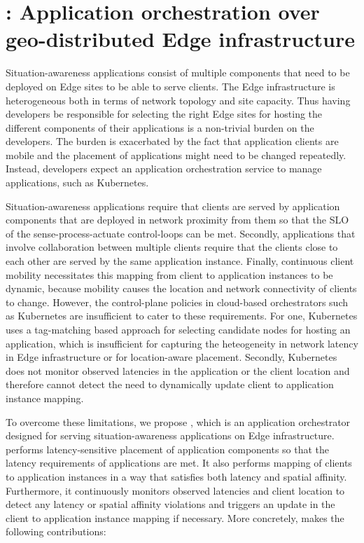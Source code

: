 \chapter{\oneedge{}: Application orchestration over geo-distributed Edge infrastructure}
\label{sec:oneedge}

\par Situation-awareness applications consist of multiple components that need to be deployed on Edge sites to be able to serve clients. The Edge infrastructure is heterogeneous both in terms of network topology and site capacity. Thus having  developers be responsible for selecting the right Edge sites for hosting the different components of their applications is a non-trivial burden on the developers. The burden is exacerbated by the fact that application clients are mobile and the placement of applications might need to be changed repeatedly. Instead, developers expect an application orchestration service to manage applications, such as Kubernetes. 
\par Situation-awareness applications require that clients are served by application components that are deployed in network proximity from them so that the SLO of the sense-process-actuate control-loops can be met. Secondly, applications that involve collaboration between multiple clients require that the clients close to each other are served by the same application instance. Finally, continuous client mobility necessitates this mapping from client to application instances to be dynamic, because mobility causes the location and network connectivity of clients to change. However, the control-plane policies in cloud-based orchestrators such as Kubernetes  are insufficient to cater to these requirements. For one, Kubernetes uses a tag-matching based approach for selecting candidate nodes for hosting an application, which is insufficient for capturing the heteogeneity in network latency in Edge infrastructure or for location-aware placement. Secondly, Kubernetes does not monitor observed latencies in the application or the client location and therefore cannot detect the need to dynamically update client to application instance mapping.
\par To overcome these limitations, we propose \oneedge{}, which is an application orchestrator designed for serving situation-awareness applications on Edge infrastructure. \oneedge{} performs latency-sensitive placement of application components so that the latency requirements of applications are met. It also performs mapping of clients to application instances in a way that satisfies both latency and spatial affinity. Furthermore, it continuously monitors observed latencies and client location to detect any latency or spatial affinity violations and triggers an update in the client to application instance mapping if necessary. More concretely, \oneedge{} makes the following contributions:
